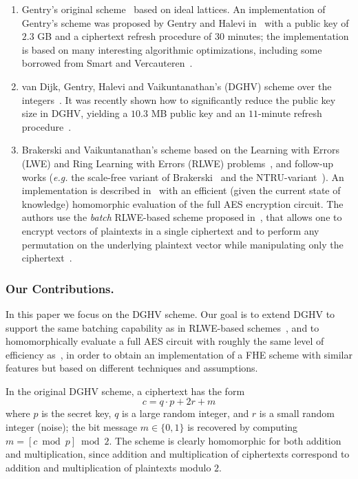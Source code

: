 \documentclass{llncs}
\newcommand{\eg}{\textsl{e.g.}\xspace}
\begin{document}
\begin{enumerate}
\item Gentry's original scheme~\cite{GenPhD} based on ideal
  lattices.  An implementation of Gentry's scheme was proposed by
  Gentry and Halevi
  in~\cite{GH2011} with a public key of $2.3$ GB and a ciphertext
  refresh procedure of $30$ minutes; the implementation is based on
  many interesting algorithmic
  optimizations, including some borrowed from Smart and Vercauteren~\cite{SV2010}.

\smallskip

\item van Dijk, Gentry, Halevi and Vaikuntanathan's (DGHV) scheme over the
  integers~\cite{vDGHV2010}. It was recently shown how to significantly
  reduce the public key size in DGHV, yielding a $10.3$ MB public key and
  an $11$-minute refresh procedure~\cite{CNT2012}.

\smallskip

\item Brakerski and Vaikuntanathan's scheme based on the Learning with
  Errors (LWE)  and Ring Learning with Errors (RLWE)
  problems~\cite{BV2011a,BV2011b}, and follow-up works (\eg the scale-free variant of Brakerski~\cite{Bra2012} and the NTRU-variant~\cite{LTV2012}). An implementation is described in~\cite{GHS2012c} with an 
  efficient (given the current state of knowledge)
  homomorphic evaluation of the full AES encryption circuit.  The
  authors use the \emph{batch} RLWE-based scheme proposed in~\cite{BGV2012,GHS2012a},
  that allows one to
 encrypt vectors of plaintexts in a single ciphertext and to
 perform any permutation on the underlying plaintext vector while
 manipulating only the ciphertext~\cite{SV2011}. 
\end{enumerate}

\subsubsection{Our Contributions.} 

In this paper we focus on the DGHV scheme. Our goal is to extend DGHV to
support the same batching capability %
as in RLWE-based
schemes~\cite{BV2011a,BV2011b}, and to homomorphically evaluate a full AES
circuit with roughly the same level of efficiency as~\cite{GHS2012c}, in
order to obtain an implementation of a FHE scheme with similar features
but based on different techniques and assumptions. 

In the original DGHV scheme, a ciphertext has the form
$$ c= q \cdot p + 2r+m$$
where $p$ is the secret key, $q$ is a large random integer, and $r$ is
a small random integer (noise); the bit message $m\in\{0,1\}$ is recovered by computing
$m=[c \bmod p]\bmod 2$.  The scheme is clearly homomorphic for both addition
and multiplication, since addition and multiplication of ciphertexts
correspond to addition and multiplication of plaintexts modulo
$2$. 
\end{document}
